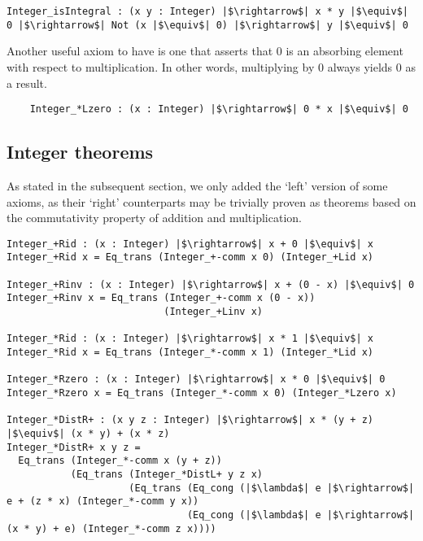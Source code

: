 \documentclass[12pt,twoside,maitrise]{dms}
\theoremstyle{definition}
\numberwithin{equation}{section}
\numberwithin{table}{chapter}
\numberwithin{figure}{chapter}
\begin{document}
\begin{verbatim}
Integer_isIntegral : (x y : Integer) |$\rightarrow$| x * y |$\equiv$| 0 |$\rightarrow$| Not (x |$\equiv$| 0) |$\rightarrow$| y |$\equiv$| 0
\end{verbatim}

Another useful axiom to have is one that asserts that 0 is an absorbing element
with respect to multiplication. In other words, multiplying by 0 always yields 0
as a result.

\begin{verbatim}
    Integer_*Lzero : (x : Integer) |$\rightarrow$| 0 * x |$\equiv$| 0
\end{verbatim}

\subsection*{Integer theorems}\label{subsection:int-theorems}
As stated in the subsequent section, we only added the `left' version of some
axioms, as their `right' counterparts may be trivially proven as theorems based
on the commutativity property of addition and multiplication.

\begin{verbatim}
Integer_+Rid : (x : Integer) |$\rightarrow$| x + 0 |$\equiv$| x
Integer_+Rid x = Eq_trans (Integer_+-comm x 0) (Integer_+Lid x)

Integer_+Rinv : (x : Integer) |$\rightarrow$| x + (0 - x) |$\equiv$| 0
Integer_+Rinv x = Eq_trans (Integer_+-comm x (0 - x))
                           (Integer_+Linv x)

Integer_*Rid : (x : Integer) |$\rightarrow$| x * 1 |$\equiv$| x
Integer_*Rid x = Eq_trans (Integer_*-comm x 1) (Integer_*Lid x)

Integer_*Rzero : (x : Integer) |$\rightarrow$| x * 0 |$\equiv$| 0
Integer_*Rzero x = Eq_trans (Integer_*-comm x 0) (Integer_*Lzero x)

Integer_*DistR+ : (x y z : Integer) |$\rightarrow$| x * (y + z) |$\equiv$| (x * y) + (x * z)
Integer_*DistR+ x y z =
  Eq_trans (Integer_*-comm x (y + z))
           (Eq_trans (Integer_*DistL+ y z x)
                     (Eq_trans (Eq_cong (|$\lambda$| e |$\rightarrow$| e + (z * x) (Integer_*-comm y x))
                               (Eq_cong (|$\lambda$| e |$\rightarrow$| (x * y) + e) (Integer_*-comm z x))))
\end{verbatim}
\end{document}
